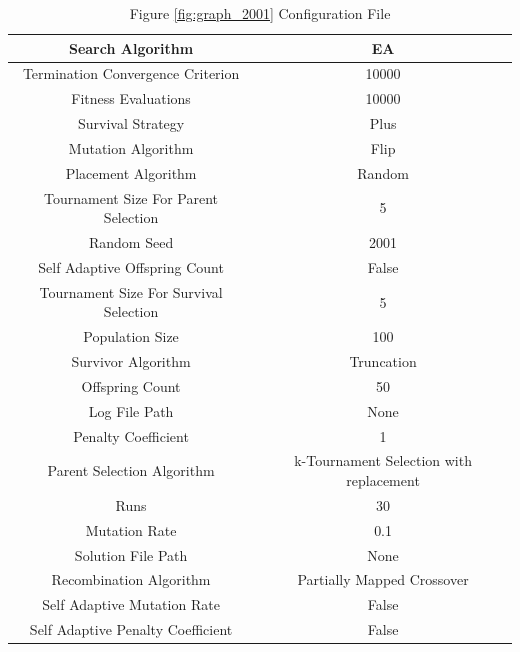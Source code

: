 \documentclass{standalone}
\begin{document}
\clearpage
\begin{table}[!htb]
	\centering
	\caption{Figure \ref{fig:graph_2001} Configuration File}
	\label{tab:graph_2001}
	\begin{tabular}{| c | c |}
		\hline
		Search Algorithm		& EA		 \\
		\hline
		Termination Convergence Criterion		& 10000		 \\
		\hline
		Fitness Evaluations		& 10000		 \\
		\hline
		Survival Strategy		& Plus		 \\
		\hline
		Mutation Algorithm		& Flip		 \\
		\hline
		Placement Algorithm		& Random		 \\
		\hline
		Tournament Size For Parent Selection		& 5		 \\
		\hline
		Random Seed		& 2001		 \\
		\hline
		Self Adaptive Offspring Count		& False		 \\
		\hline
		Tournament Size For Survival Selection		& 5		 \\
		\hline
		Population Size		& 100		 \\
		\hline
		Survivor Algorithm		& Truncation		 \\
		\hline
		Offspring Count		& 50		 \\
		\hline
		Log File Path		& None		 \\
		\hline
		Penalty Coefficient		& 1		 \\
		\hline
		Parent Selection Algorithm		& k-Tournament Selection with replacement		 \\
		\hline
		Runs		& 30		 \\
		\hline
		Mutation Rate		& 0.1		 \\
		\hline
		Solution File Path		& None		 \\
		\hline
		Recombination Algorithm		& Partially Mapped Crossover		 \\
		\hline
		Self Adaptive Mutation Rate		& False		 \\
		\hline
		Self Adaptive Penalty Coefficient		& False		 \\
		\hline
	\end{tabular}
\end{table}
\end{document}
